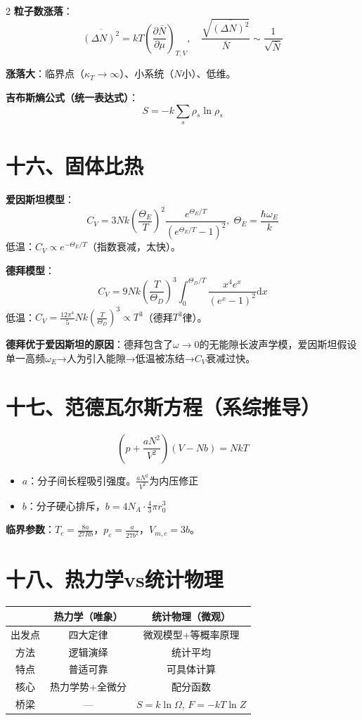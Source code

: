 \documentclass[10pt,a4paper,fontset=mac]{ctexart}
\newcommand{\dd}{\mathrm{d}}
\newcommand{\đ}{\mathrm{đ}}
\begin{document}
\begin{multicols}{2}
\textbf{粒子数涨落}：
\[
\overline{(\Delta N)^2}=kT\!\left(\frac{\partial\bar{N}}{\partial\mu}\right)_{T,V},\quad
\frac{\sqrt{\overline{(\Delta N)^2}}}{\bar{N}}\sim\frac{1}{\sqrt{\bar{N}}}
\]

\textbf{涨落大}：临界点（$\kappa_T\to\infty$）、小系统（$N$小）、低维。

\textbf{吉布斯熵公式（统一表达式）}：
\[
\boxed{S=-k\sum_s\rho_s\ln\rho_s}
\]

\section*{十六、固体比热}

\textbf{爱因斯坦模型}：
\[
C_V=3Nk\!\left(\frac{\Theta_E}{T}\right)^2\!\frac{e^{\Theta_E/T}}{(e^{\Theta_E/T}-1)^2},\;
\Theta_E=\frac{\hbar\omega_E}{k}
\]
低温：$C_V\propto e^{-\Theta_E/T}$（指数衰减，太快）。

\textbf{德拜模型}：
\[
C_V=9Nk\!\left(\frac{T}{\Theta_D}\right)^3\!\int_0^{\Theta_D/T}\!\!\frac{x^4e^x}{(e^x-1)^2}\dd x
\]
低温：$\boxed{C_V=\frac{12\pi^4}{5}Nk(\frac{T}{\Theta_D})^3\propto T^3}$（德拜$T^3$律）。

\textbf{德拜优于爱因斯坦的原因}：德拜包含了$\omega\to0$的无能隙长波声学模，爱因斯坦假设单一高频$\omega_E$→人为引入能隙→低温被冻结→$C_V$衰减过快。

\section*{十七、范德瓦尔斯方程（系综推导）}

\[
\boxed{\left(p+\frac{aN^2}{V^2}\right)(V-Nb)=NkT}
\]
\begin{itemize}
\item $a$：分子间长程吸引强度。$\frac{aN^2}{V^2}$为内压修正
\item $b$：分子硬心排斥，$b=4N_A\cdot\frac{4}{3}\pi r_0^3$
\end{itemize}

\textbf{临界参数}：$T_c=\frac{8a}{27Rb}$，$p_c=\frac{a}{27b^2}$，$V_{m,c}=3b$。

\section*{十八、热力学vs统计物理}

\begin{tabular}{c|c|c}
 & 热力学（唯象） & 统计物理（微观） \\
\hline
出发点 & 四大定律 & 微观模型+等概率原理 \\
方法 & 逻辑演绎 & 统计平均 \\
特点 & 普适可靠 & 可具体计算 \\
核心 & 热力学势+全微分 & 配分函数 \\
桥梁 & — & $S=k\ln\Omega$, $F=-kT\ln Z$ \\
\end{tabular}


\end{multicols}
\end{document}
